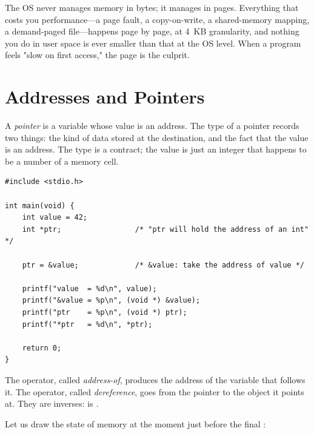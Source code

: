 \begin{insight}
The OS never manages memory in bytes; it manages in pages. Everything
that costs you performance---a page fault, a copy-on-write, a
shared-memory mapping, a demand-paged file---happens page by page, at
4~KB granularity, and nothing you do in user space is ever smaller
than that at the OS level. When a program feels "slow on first
access," the page is the culprit.
\end{insight}

\section{Addresses and Pointers}

A \emph{pointer} is a variable whose value is an address. The type of a
pointer records two things: the kind of data stored at the destination,
and the fact that the value is an address. The type is a contract; the
value is just an integer that happens to be a number of a memory cell.

\begin{lstlisting}[caption={A pointer is a variable holding an address.}]
#include <stdio.h>

int main(void) {
    int value = 42;
    int *ptr;                 /* "ptr will hold the address of an int" */

    ptr = &value;             /* &value: take the address of value */

    printf("value  = %d\n", value);
    printf("&value = %p\n", (void *) &value);
    printf("ptr    = %p\n", (void *) ptr);
    printf("*ptr   = %d\n", *ptr);

    return 0;
}
\end{lstlisting}

The \code{\&} operator, called \emph{address-of}, produces the address
of the variable that follows it. The \code{*} operator, called
\emph{dereference}, goes from the pointer to the object it points at.
They are inverses:  is .

Let us draw the state of memory at the moment just before the final
:

